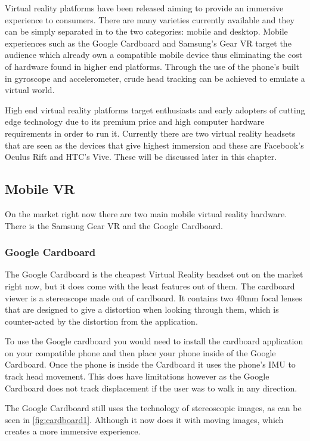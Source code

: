 \newline
\par
Virtual reality platforms have been released aiming to provide an immersive experience to consumers. There are many varieties currently available and they can be simply separated in to the two categories: mobile and desktop. Mobile experiences such as the Google Cardboard and Samsung's Gear VR target the audience which already own a compatible mobile device thus eliminating the cost of hardware found in higher end platforms. Through the use of the phone's built in gyroscope and accelerometer, crude head tracking can be achieved to emulate a virtual world.
\newline
\par
High end virtual reality platforms target enthusiasts and early adopters of cutting edge technology due to its premium price and high computer hardware requirements in order to run it. Currently there are two virtual reality headsets that are seen as the devices that give highest immersion and these are Facebook's Oculus Rift and HTC's Vive. These will be discussed later in this chapter.

\subsection{Mobile VR}
On the market right now there are two main mobile virtual reality hardware. There is the Samsung Gear VR and the Google Cardboard.

\subsubsection{Google Cardboard}
The Google Cardboard is the cheapest Virtual Reality headset out on the market right now, but it does come with the least features out of them. The cardboard viewer is a stereoscope made out of cardboard. It contains two 40mm focal lenses that are designed to give a distortion when looking through them, which is counter-acted by the distortion from the application\cite{cardboarddev}.
\newline
\par
To use the Google cardboard you would need to install the cardboard application on your compatible phone and then place your phone inside of the Google Cardboard. Once the phone is inside the Cardboard it uses the phone's IMU to track head movement. This does have limitations however as the Google Cardboard does not track displacement if the user was to walk in any direction.
\newline
\par
The Google Cardboard still uses the technology of stereoscopic images, as can be seen in \ref{fig:cardboard1}. Although it now does it with moving images, which creates a more immersive experience. \\

